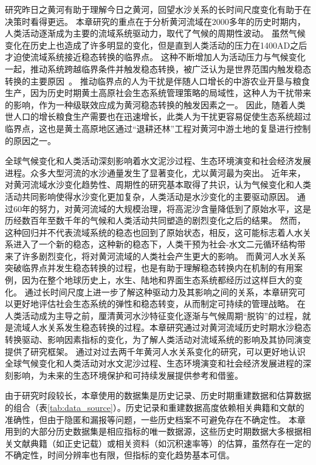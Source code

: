 研究昨日之黄河有助于理解今日之黄河，回望水沙关系的长时间尺度变化有助于在决策时看得更远。
本章研究的重点在于分析黄河流域在$2000$多年的历史时期内，人类活动逐渐成为主要的流域系统驱动力，取代了气候的周期性波动。
虽然气候变化在历史上也造成了许多明显的变化，但是直到人类活动的压力在1400AD之后才迫使流域系统接近稳态转换的临界点。
这种不断增加人为活动压力与气候变化一起，推动系统跨越临界条件并触发稳态转换，被广泛认为是世界范围内触发稳态转换的主要原因~\cite{scheffer2001,scheffer2003}。
推动临界点的人为干扰是伴随人口增长的中游农业开垦与粮食生产，因为历史时期黄土高原社会\textendash{}生态系统管理策略的局域性，这种人为干扰带来的影响，作为一种级联效应成为黄河稳态转换的触发因素之一\cite{rocha2018,wu2020a}。
因此，随着人类世人口的增长粮食生产需要也在迅速增长，此类人为干扰更容易促使生态系统超过临界点，这也是黄土高原地区通过“退耕还林”工程对黄河中游土地的复垦进行控制的原因之一。

全球气候变化和人类活动深刻影响着水文泥沙过程、生态环境演变和社会经济发展进程。众多大型河流的水沙通量发生了显著变化，尤以黄河最为突出\cite{best2019, best2020}。
近年来，对黄河流域水沙变化趋势性、周期性的研究基本取得了共识，认为气候变化和人类活动共同影响使得水沙变化更加复杂，人类活动是水沙变化的主要驱动原因\cite{wang2016a, ma2020}。
通过$60$年的努力，对黄河流域的大规模治理，将高泥沙含量降低到了原始水平，这是历经数百年至数千年的气候和人类活动共同塑造的剧烈变化之后的结果\cite{wang2016a, ji2018}。
然而，这种回归并不代表流域系统的稳态也回到了原始状态，相反，这可能标志着人\textendash{}水关系进入了一个新的稳态，这种新的稳态下，人类干预为社会-水文二元循环结构带来了许多剧烈变化，将对黄河流域的人类社会产生更大的影响。
而黄河人\textendash{}水关系突破临界点并发生稳态转换的过程，也是有助于理解稳态转换内在机制的有用案例，因为在整个地球历史上，水生、陆地和界面生态系统都经历过这样巨大的变化\cite{hughes2013, rocha2018}。
通过长时间尺度上进一步了解这种驱动力及其影响之间的关系，本章研究可以更好地评估社会\textendash{}生态系统的弹性和稳态转变，从而制定可持续的管理战略\cite{scheffer2003}。
在人类活动成为主导之前，厘清黄河水沙特征变化逐渐与气候周期“脱钩”的过程，就是流域人\textendash{}水关系发生稳态转换的过程。本章研究通过对黄河流域历史时期水沙稳态转换驱动、影响因素指标的变化，为了解人类活动对流域系统的影响及其协同演变提供了研究框架。
通过对过去两千年黄河人\textendash{}水关系变化的研究，可以更好地认识全球气候变化和人类活动对水文泥沙过程、生态环境演变和社会经济发展进程的深刻影响，为未来的生态环境保护和可持续发展提供参考和借鉴。

由于研究时段较长，本章使用的数据集是历史记录、历史时期重建数据和估算数据的组合（表\ref{tab:data_source}）。历史记录和重建数据高度依赖相关典籍和文献的准确性，但由于隐匿和漏报等问题，一些历史档案不可避免存在不确定性\cite{wu2020a}。
本章用到的大部分历史数据集是相应指标的唯一数据源，这些历史时期数据大多根据相关文献典籍（如正史记载）或相关资料（如沉积速率等）的估算，虽然存在一定的不确定性，时间分辨率也有限，但指标的变化趋势基本可信。
